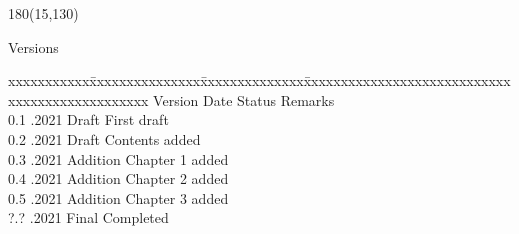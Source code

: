 
\begin{textblock}{180}(15,130)
\color{black}
\begin{huge}
Versions
\end{huge}
\vspace{5mm}

\fontsize{10pt}{18pt}\selectfont
\begin{tabbing}
xxxxxxxxxxx\=xxxxxxxxxxxxxxx\=xxxxxxxxxxxxxx\=xxxxxxxxxxxxxxxxxxxxxxxxxxxxxxxxxxxxxxxxxxxxxxx \kill
Version	\> Date	\> Status			\> Remarks		\\
0.1 .2021 \> Draft      \> First draft           \\
0.2 .2021 \> Draft      \> Contents added        \\
0.3 .2021 \> Addition   \> Chapter 1 added       \\
0.4 .2021 \> Addition   \> Chapter 2 added       \\
0.5 .2021 \> Addition   \> Chapter 3 added       \\
?.? .2021 \> Final      \> Completed             \\
\end{tabbing}

\end{textblock}



